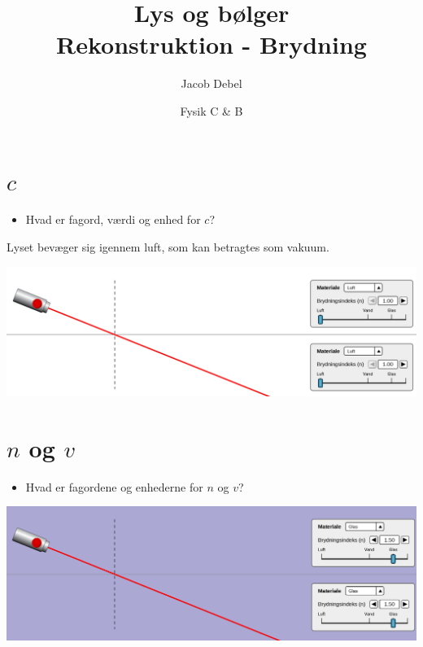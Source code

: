 \documentclass[a4paper, 12pt]{article}
\author{Jacob Debel}
\date{Fysik C \& B}
\title{Lys og bølger\\\medskip
\large Rekonstruktion - Brydning}
\begin{document}
\maketitle


\section*{\(c\)}
\label{sec:org7b092d9}
\begin{minipage}{0.3\linewidth}
\begin{itemize}
\item Hvad er fagord,  værdi og enhed for \(c\)?
\end{itemize}
\end{minipage}
\vline
\begin{minipage}{0.68\linewidth}
Lyset bevæger sig igennem luft, som kan betragtes som vakuum.
\begin{center}
\includegraphics[width=.9\linewidth]{./img/laser_luft_luft.png}
\end{center}
\end{minipage}

\vfill
\section*{\(n\) og \(v\)}
\label{sec:org70f32c1}
\begin{minipage}{0.3\linewidth}
\begin{itemize}
\item Hvad er fagordene og enhederne for \(n\) og \(v\)?
\end{itemize}
\end{minipage}
\vline
\begin{minipage}{0.68\linewidth}
\begin{center}
\includegraphics[width=.9\linewidth]{./img/laser_glas_glas.png}
\end{center}
\end{minipage}
\end{document}
